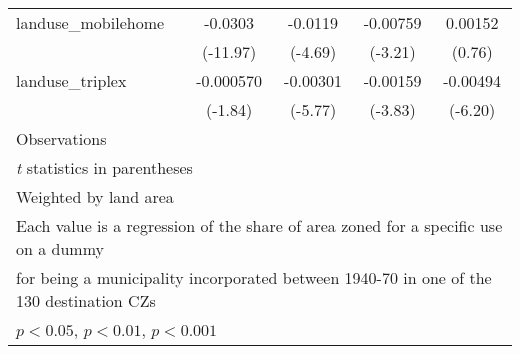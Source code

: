 \begin{table}[htbp]
\begin{tabular}{l*{4}{c}}
\addlinespace
landuse\_mobilehome  &     -0.0303\sym{***}&     -0.0119\sym{***}&    -0.00759\sym{**} &     0.00152         \\
                    &    (-11.97)         &     (-4.69)         &     (-3.21)         &      (0.76)         \\
\addlinespace
landuse\_triplex     &   -0.000570         &    -0.00301\sym{***}&    -0.00159\sym{***}&    -0.00494\sym{***}\\
                    &     (-1.84)         &     (-5.77)         &     (-3.83)         &     (-6.20)         \\
\midrule
Observations        &                     &                     &                     &                     \\
\bottomrule
\multicolumn{5}{l}{\footnotesize \textit{t} statistics in parentheses}\\
\multicolumn{5}{l}{\footnotesize Weighted by land area}\\
\multicolumn{5}{l}{\footnotesize Each value is a regression of the share of area zoned for a specific use on a dummy}\\
\multicolumn{5}{l}{\footnotesize for being a municipality incorporated between 1940-70 in one of the 130 destination CZs}\\
\multicolumn{5}{l}{\footnotesize \sym{*} \(p<0.05\), \sym{**} \(p<0.01\), \sym{***} \(p<0.001\)}\\
\end{tabular}
\end{table}
